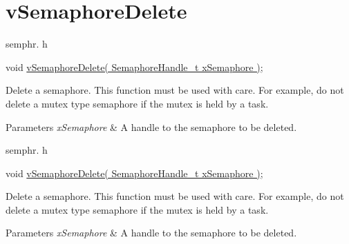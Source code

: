 \hypertarget{group__v_semaphore_delete}{}\section{v\+Semaphore\+Delete}
\label{group__v_semaphore_delete}
semphr. h 
\begin{DoxyPre}
void \hyperlink{vendor_2ceedling_2plugins_2freertos_2src_2freertos_2include_2semphr_8h_acd7d0eda0923d7caeeaaee9202c43eab}{vSemaphoreDelete( SemaphoreHandle\_t xSemaphore )};
\end{DoxyPre}


Delete a semaphore. This function must be used with care. For example, do not delete a mutex type semaphore if the mutex is held by a task.


\begin{DoxyParams}{Parameters}
{\em x\+Semaphore} & A handle to the semaphore to be deleted.\\
\hline
\end{DoxyParams}
semphr. h 
\begin{DoxyPre}void \hyperlink{vendor_2ceedling_2plugins_2freertos_2src_2freertos_2include_2semphr_8h_acd7d0eda0923d7caeeaaee9202c43eab}{vSemaphoreDelete( SemaphoreHandle\_t xSemaphore )};\end{DoxyPre}


Delete a semaphore. This function must be used with care. For example, do not delete a mutex type semaphore if the mutex is held by a task.


\begin{DoxyParams}{Parameters}
{\em x\+Semaphore} & A handle to the semaphore to be deleted. \\
\hline
\end{DoxyParams}

